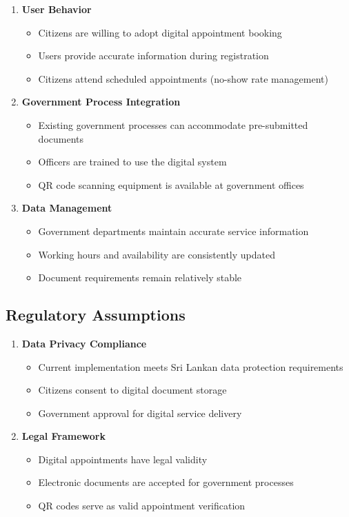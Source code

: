 \documentclass[11pt,a4paper]{article}
\begin{document}
\begin{enumerate}[leftmargin=*]
    \item \textbf{User Behavior}
    \begin{itemize}
        \item Citizens are willing to adopt digital appointment booking
        \item Users provide accurate information during registration
        \item Citizens attend scheduled appointments (no-show rate management)
    \end{itemize}
    
    \item \textbf{Government Process Integration}
    \begin{itemize}
        \item Existing government processes can accommodate pre-submitted documents
        \item Officers are trained to use the digital system
        \item QR code scanning equipment is available at government offices
    \end{itemize}
    
    \item \textbf{Data Management}
    \begin{itemize}
        \item Government departments maintain accurate service information
        \item Working hours and availability are consistently updated
        \item Document requirements remain relatively stable
    \end{itemize}
\end{enumerate}

\subsection{Regulatory Assumptions}

\begin{enumerate}[leftmargin=*]
    \item \textbf{Data Privacy Compliance}
    \begin{itemize}
        \item Current implementation meets Sri Lankan data protection requirements
        \item Citizens consent to digital document storage
        \item Government approval for digital service delivery
    \end{itemize}
    
    \item \textbf{Legal Framework}
    \begin{itemize}
        \item Digital appointments have legal validity
        \item Electronic documents are accepted for government processes
        \item QR codes serve as valid appointment verification
    \end{itemize}
\end{enumerate}
\end{document}

